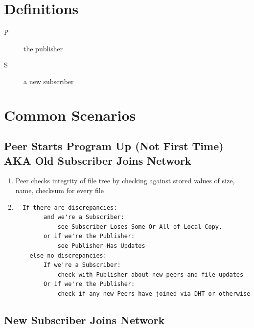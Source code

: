 \documentclass[12pt,a4paper,]{adreport}
\begin{document}
\section{Definitions}\label{definitions}

\begin{description}
\item[P]
the publisher
\item[S]
a new subscriber
\end{description}

\section{Common Scenarios}\label{common-scenarios}

\subsection{Peer Starts Program Up (Not First Time) AKA Old Subscriber
Joins
Network}\label{peer-starts-program-up-not-first-time-aka-old-subscriber-joins-network}

\begin{enumerate}
\def\labelenumi{\arabic{enumi}.}
\item
  Peer checks integrity of file tree by checking against stored values
  of size, name, checksum for every file
\item
\begin{verbatim}
  If there are discrepancies:
        and we're a Subscriber:
            see Subscriber Loses Some Or All of Local Copy.
        or if we're the Publisher:
            see Publisher Has Updates
    else no discrepancies:
        If we're a Subscriber:
            check with Publisher about new peers and file updates
        Or if we're the Publisher:
            check if any new Peers have joined via DHT or otherwise
\end{verbatim}
\end{enumerate}

\subsection{New Subscriber Joins
Network}\label{new-subscriber-joins-network}
\end{document}
